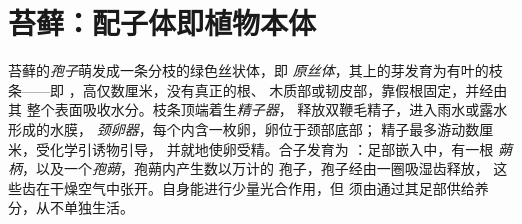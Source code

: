\section{苔藓：配子体即植物本体}

\begin{definition}[苔藓的生活史]\label{def:b2:plant-life-cycles:moss}
苔藓的\emph{孢子}萌发成一条分枝的绿色丝状体，即
\emph{原丝体}，其上的芽发育为有叶的枝条——即
\emph{}，高仅数厘米，没有真正的根、
木质部或韧皮部，靠假根固定，并经由其
整个表面吸收水分。枝条顶端着生\emph{精子器}，
释放双鞭毛精子，进入雨水或露水形成的水膜，
\emph{颈卵器}，每个内含一枚卵，卵位于颈部底部；
精子最多游动数厘米，受化学引诱物引导，
并就地使卵受精。合子发育为
\emph{}：足部嵌入中，有一根
\emph{蒴柄}，以及一个\emph{孢蒴}，孢蒴内产生数以万计的
孢子，孢子经由一圈吸湿齿释放，
这些齿在干燥空气中张开。自身能进行少量光合作用，但
须由通过其足部供给养分，从不单独生活。
\end{definition}


